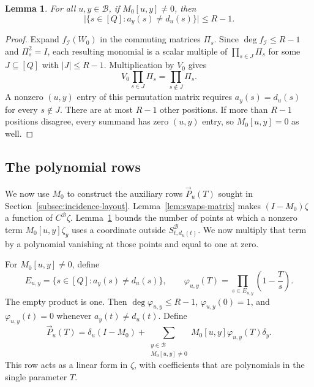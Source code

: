 \documentclass[11pt,reqno]{amsart}
\numberwithin{equation}{section}
\newtheorem{lemma}[theorem]{Lemma}
\theoremstyle{definition}\newtheorem{definition}[theorem]{Definition}
\theoremstyle{remark}\newtheorem{remark}[theorem]{Remark}
\renewcommand{\le}{\leqslant}
\begin{document}
\begin{lemma}\label{lem:swaps-support}
For all $u,y\in\mathcal B$, if $M_0[u,y]\ne0$, then
\[
 \bigl|\{s\in[Q]:a_y(s)\ne d_u(s)\}\bigr|\le R-1.
\]
\end{lemma}
\begin{proof}
Expand $f_{\mathcal I}(W_0)$ in the commuting matrices $\Pi_s$.
Since $\deg f_{\mathcal I}\le R-1$ and $\Pi_s^2=I$, each resulting
monomial is a scalar multiple of $\prod_{s\in J}\Pi_s$ for some
$J\subseteq[Q]$ with $|J|\le R-1$. Multiplication by $V_0$ gives
\[
 V_0\prod_{s\in J}\Pi_s=\prod_{s\notin J}\Pi_s.
\]
A nonzero $(u,y)$ entry of this permutation matrix requires
$a_y(s)=d_u(s)$ for every $s\notin J$. There are at most $R-1$
other positions. If more than $R-1$ positions disagree, every
summand has zero $(u,y)$ entry, so $M_0[u,y]=0$ as well.
\end{proof}

\subsection{The polynomial rows}
We now use $M_0$ to construct the auxiliary rows $\vec{P}_u(T)$ sought
in Section~\ref{subsec:incidence-layout}.
Lemma~\ref{lem:swaps-matrix} makes $(I-M_0)\zeta$ a function of
$C^{\mathcal B}\zeta$. Lemma~\ref{lem:swaps-support} bounds the number
of points at which a nonzero term $M_0[u,y]\zeta_y$ uses a coordinate
outside $S^{\mathcal B}_{t,d_u(t)}$. We now multiply that term by a
polynomial vanishing at those points and equal to one at zero.

For $M_0[u,y]\ne0$, define
\begin{equation}\label{eq:coefficient-correction}
 E_{u,y}=\{s\in[Q]:a_y(s)\ne d_u(s)\},\qquad
 \varphi_{u,y}(T)=\prod_{s\in E_{u,y}}\left(1-\frac Ts\right).
\end{equation}
The empty product is one. Then $\deg\varphi_{u,y}\le R-1$,
$\varphi_{u,y}(0)=1$, and $\varphi_{u,y}(t)=0$ whenever
$a_y(t)\ne d_u(t)$. Define
\begin{equation}\label{eq:swaps-row}
 \vec{P}_u(T)=\delta_u(I-M_0)+
 \sum_{\substack{y\in\mathcal B\\M_0[u,y]\ne0}}
 M_0[u,y]\varphi_{u,y}(T)\delta_y.
\end{equation}
This row acts as a linear form in $\zeta$, with coefficients that are
polynomials in the single parameter $T$.
\end{document}
